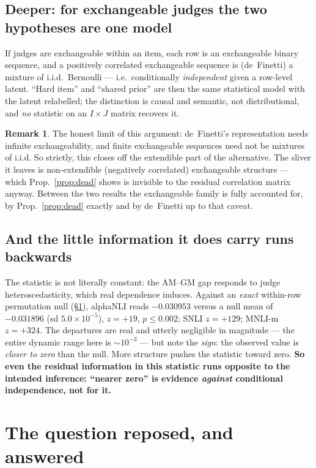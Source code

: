 \documentclass[11pt]{article}
\theoremstyle{definition}
\newtheorem{remark}[proposition]{Remark}
\begin{document}
\subsection{Deeper: for exchangeable judges the two hypotheses are one model}

If judges are exchangeable within an item, each row is an exchangeable binary
sequence, and a positively correlated exchangeable sequence is (de~Finetti) a
mixture of i.i.d.\ Bernoulli --- i.e.\ conditionally \emph{independent} given a
row-level latent. ``Hard item'' and ``shared prior'' are then the same statistical
model with the latent relabelled; the distinction is causal and semantic, not
distributional, and \emph{no} statistic on an $I\times J$ matrix recovers it.

\begin{remark}
The honest limit of this argument: de~Finetti's representation needs infinite
exchangeability, and finite exchangeable sequences need not be mixtures of i.i.d.
So strictly, this closes off the extendible part of the alternative. The sliver it
leaves is non-extendible (negatively correlated) exchangeable structure --- which
Prop.~\ref{prop:dead} shows is invisible to the residual correlation matrix anyway.
Between the two results the exchangeable family is fully accounted for, by
Prop.~\ref{prop:dead} exactly and by de~Finetti up to that caveat.
\end{remark}

\subsection{And the little information it does carry runs backwards}

The statistic is not literally constant: the AM--GM gap responds to judge
heteroscedasticity, which real dependence induces. Against an \emph{exact}
within-row permutation null (\S\ref{sec:repose}), alphaNLI reads $-0.030953$ versus a
null mean of $-0.031896$ (sd $5.0\times10^{-5}$), $z=+19$, $p\le0.002$; SNLI
$z=+129$; MNLI-m $z=+324$. The departures are real and utterly negligible in
magnitude --- the entire dynamic range here is $\sim10^{-3}$ --- but note the
\emph{sign}: the observed value is \emph{closer to zero} than the null. More
structure pushes the statistic toward zero. \textbf{So even the residual
information in this statistic runs opposite to the intended inference: ``nearer
zero'' is evidence \emph{against} conditional independence, not for it.}

\section{The question reposed, and answered}\label{sec:repose}
\end{document}
